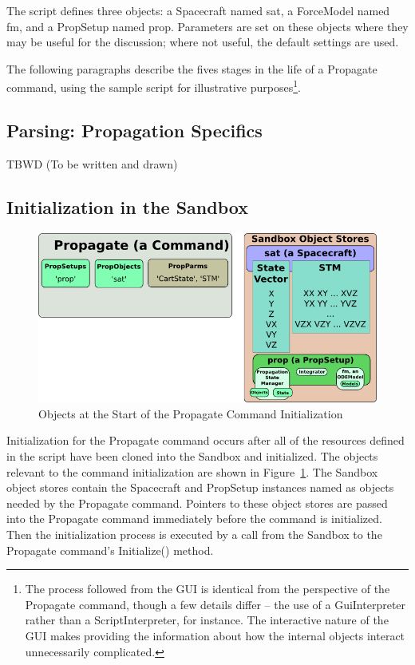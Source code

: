 \documentclass[11pt]{article}
\begin{document}
\noindent The script defines three objects: a Spacecraft named sat, a ForceModel named fm, and a PropSetup named prop.  Parameters are set on these objects where they may be useful for the discussion; where not useful, the default settings are used.

The following paragraphs describe the fives stages in the life of a Propagate command, using the sample script for illustrative purposes\footnote{The process followed from the GUI is identical from the perspective of the Propagate command, though a few details differ -- the use of a GuiInterpreter rather than a ScriptInterpreter, for instance.  The interactive nature of the GUI makes providing the information about how the internal objects interact unnecessarily complicated.}.

\subsection{Parsing: Propagation Specifics}

TBWD  (To be written and drawn)

\subsection{Initialization in the Sandbox}

\begin{figure}[htb] 
   \centering
   \includegraphics[width=5.5in]{Images/PersistenceStart.png} 
   \caption{Objects at the Start of the Propagate Command Initialization}
   \label{fig:PersistenceStart}
\end{figure}

Initialization for the Propagate command occurs after all of the resources defined in the script have been cloned into the Sandbox and initialized.  The objects relevant to the command initialization are shown in Figure~\ref{fig:PersistenceStart}.  The Sandbox object stores contain the Spacecraft and PropSetup instances named as objects needed by the Propagate command.  Pointers to these object stores are passed into the Propagate command immediately before the command is initialized.  Then the initialization process is executed by a call from the Sandbox to the Propagate command's Initialize() method.
\end{document}
